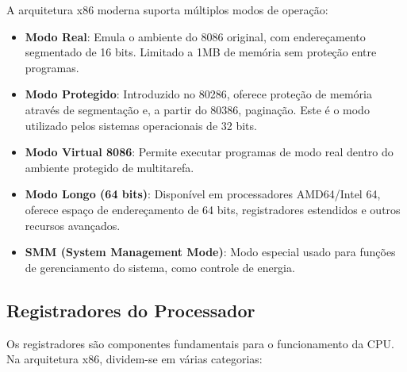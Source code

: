 A arquitetura x86 moderna suporta múltiplos modos de operação:

\begin{itemize}
    \item \textbf{Modo Real}: Emula o ambiente do 8086 original, com endereçamento segmentado de 16 bits. Limitado a 1MB de memória sem proteção entre programas.

    \item \textbf{Modo Protegido}: Introduzido no 80286, oferece proteção de memória através de segmentação e, a partir do 80386, paginação. Este é o modo utilizado pelos sistemas operacionais de 32 bits.

    \item \textbf{Modo Virtual 8086}: Permite executar programas de modo real dentro do ambiente protegido de multitarefa.

    \item \textbf{Modo Longo (64 bits)}: Disponível em processadores AMD64/Intel 64, oferece espaço de endereçamento de 64 bits, registradores estendidos e outros recursos avançados.

    \item \textbf{SMM (System Management Mode)}: Modo especial usado para funções de gerenciamento do sistema, como controle de energia.
\end{itemize}

\subsection{Registradores do Processador}
\label{subsec:registradores}

Os registradores são componentes fundamentais para o funcionamento da CPU. Na arquitetura x86, dividem-se em várias categorias:

